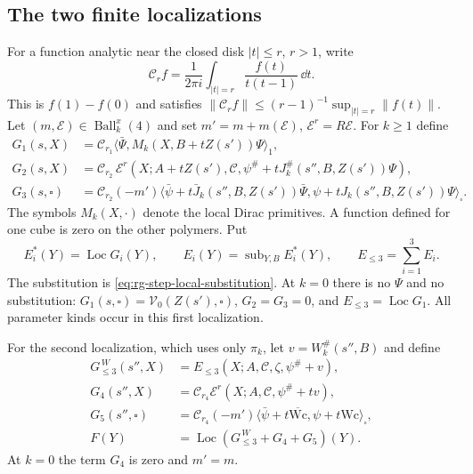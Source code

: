 \subsection{The two finite localizations}
\label{subsec:rgnl-finite-localizations}

For a function analytic near the closed disk $|t|\le r$, $r>1$,
write
\[
 \mathcal C_rf=\frac1{2\pi i}\int_{|t|=r}
                                      \frac{f(t)}{t(t-1)}\,\dd t .
\]
This is $f(1)-f(0)$ and satisfies
$\|\mathcal C_rf\|\le(r-1)^{-1}\sup_{|t|=r}\|f(t)\|$.
Let $(m,\mathscr E)\in\operatorname{Ball}_k^x(4)$ and set
$m'=m+m(\mathscr E)$, $\mathscr E^r=R\mathscr E$.
For $k\ge1$ define
\begin{align}
 G_1(s,X)&=\mathcal C_{r_1}
                \langle\bar\Psi,M_k(X,B+tZ(s'))\Psi\rangle_1,
                                      \label{eq:rgnl-G1}\\
 G_2(s,X)&=\mathcal C_{r_2}\,
       \mathscr E^r(X;A+tZ(s'),\mathscr C,
                    \psi^\#+tJ_k^\#(s'',B,Z(s'))\Psi),
                                      \label{eq:rgnl-G2}\\
 G_3(s,\square)&=\mathcal C_{r_2}(-m')
       \langle\bar\psi+t\bar J_k(s'',B,Z(s'))\bar\Psi,
                         \psi+tJ_k(s'',B,Z(s'))\Psi\rangle_\square .
                                      \label{eq:rgnl-G3}
\end{align}
The symbols $M_k(X,\cdot)$ denote the local Dirac primitives.
A function defined for one cube is zero on the other polymers.
Put
\[
 E_i^*(Y)=\operatorname{Loc}G_i(Y),\qquad
 E_i(Y)=\operatorname{sub}_{Y,B}E_i^*(Y),\qquad
 E_{\le3}=\sum_{i=1}^3E_i.
\]
The substitution is \eqref{eq:rg-step-local-substitution}.
At $k=0$ there is no $\Psi$ and no substitution:
$G_1(s,\square)=\mathcal V_0(Z(s'),\square)$,
$G_2=G_3=0$, and $E_{\le3}=\operatorname{Loc}G_1$.
All parameter kinds occur in this first localization.

For the second localization, which uses only $\pi_k$, let
$v=W_k^\#(s'',B)$ and define
\begin{align}
 G_{\le3}^{\,W}(s'',X)&=E_{\le3}(X;A,\mathscr C,\zeta,
                                                      \psi^\#+v),
                                      \label{eq:rgnl-GW}\\
 G_4(s'',X)&=\mathcal C_{r_4}
                  \mathscr E^r(X;A,\mathscr C,\psi^\#+tv),\\
 G_5(s'',\square)&=\mathcal C_{r_4}(-m')
                 \langle\bar\psi+t\overline{\mathrm{Wc}},
                                   \psi+t\mathrm{Wc}\rangle_\square,\\
 F(Y)&=\operatorname{Loc}(G_{\le3}^{\,W}+G_4+G_5)(Y).
                                      \label{eq:rgnl-finite-activity}
\end{align}
At $k=0$ the term $G_4$ is zero and $m'=m$.


